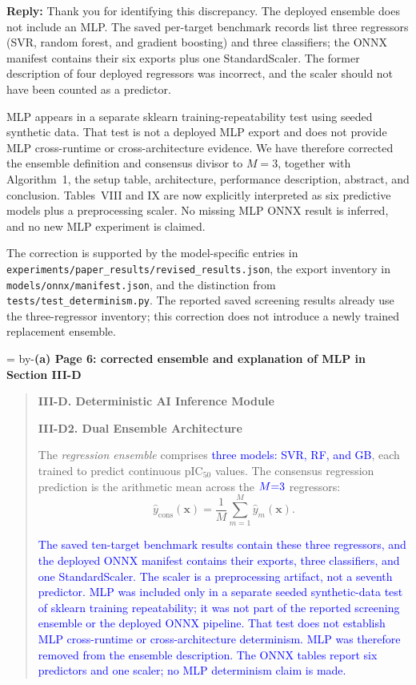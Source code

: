 \documentclass[11pt]{article}
\newenvironment{excerpt}{\begin{quote}\small\sloppy}{\end{quote}}
\newcommand{\roomfor}[1]{\par\begingroup\dimen0=\pagegoal\advance\dimen0 by-\pagetotal\ifdim\dimen0<#1\baselineskip\newpage\fi\endgroup}
\newcommand{\reply}{\noindent\textbf{Reply:} }
\newcommand{\loc}[1]{\roomfor{7}\medskip\noindent\textbf{#1}\par\smallskip}
\newcommand{\mshead}[2]{\par\noindent\textbf{#1. #2}\par\smallskip}
\begin{document}
\reply Thank you for identifying this discrepancy. The
deployed ensemble does not include an MLP. The saved per-target benchmark
records list three regressors (SVR, random forest, and gradient boosting)
and three classifiers; the ONNX manifest contains their six exports plus
one StandardScaler. The former description of four deployed regressors
was incorrect, and the scaler should not have been counted as a predictor.

MLP appears in a separate sklearn training-repeatability test using seeded
synthetic data. That test is not a deployed MLP export and does not provide
MLP cross-runtime or cross-architecture evidence. We have therefore
corrected the ensemble definition and consensus divisor to $M=3$, together
with Algorithm~1, the setup table, architecture, performance description,
abstract, and conclusion. Tables~VIII and IX are now explicitly interpreted
as six predictive models plus a preprocessing scaler. No missing MLP
ONNX result is inferred, and no new MLP experiment is claimed.

The correction is supported by the model-specific entries in
\nolinkurl{experiments/paper_results/revised_results.json}, the export
inventory in \nolinkurl{models/onnx/manifest.json}, and the distinction
from \nolinkurl{tests/test_determinism.py}. The reported saved screening
results already use the three-regressor inventory; this correction does
not introduce a newly trained replacement ensemble.

\loc{(a) Page 6: corrected ensemble and explanation of MLP in Section III-D}
\begin{excerpt}
\mshead{III-D}{Deterministic AI Inference Module}
\mshead{III-D2}{Dual Ensemble Architecture}

The \emph{regression ensemble} comprises \textcolor{blue}{three models: SVR, RF, and GB}, each trained to predict continuous
pIC$_{50}$ values.
The consensus regression prediction is the arithmetic
mean across the $\textcolor{blue}{M{=}3}$ regressors:
\begin{equation}
\hat{y}_{\mathrm{cons}}(\mathbf{x})
  = \frac{1}{M}\sum_{m=1}^{M}\hat{y}_m(\mathbf{x}).
\tag{2}
\end{equation}

\textcolor{blue}{The saved ten-target benchmark results contain these
three regressors, and the deployed ONNX manifest contains their
exports, three classifiers, and one StandardScaler. The scaler is
a preprocessing artifact, not a seventh predictor. MLP was included
only in a separate seeded synthetic-data test of sklearn training
repeatability; it was not part of the reported screening ensemble
or the deployed ONNX pipeline. That test does not establish MLP
cross-runtime or cross-architecture determinism. MLP was therefore removed from the ensemble description. The ONNX tables report six
predictors and one scaler; no MLP determinism claim is made.}
\end{excerpt}
\end{document}
